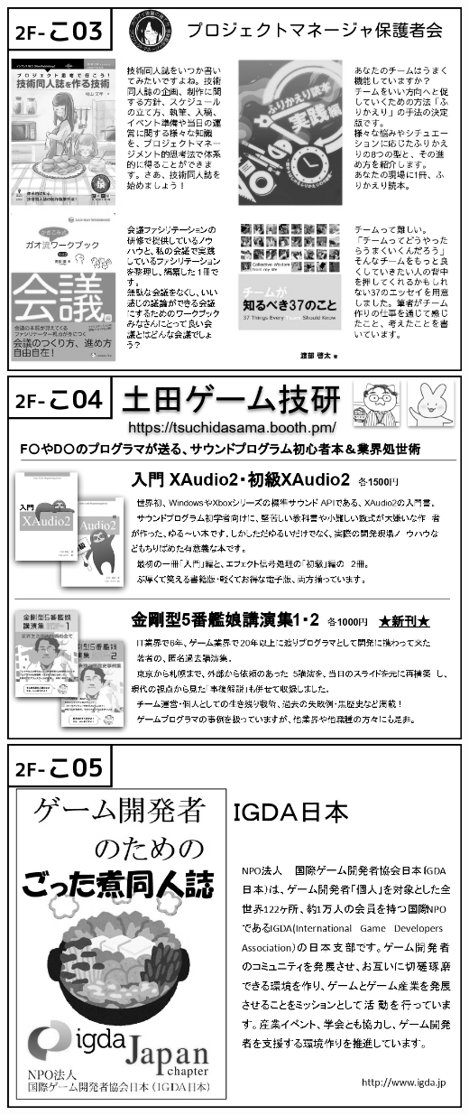 \begin{center}
\includegraphics[width=0.9\linewidth]{images/circle-appeals/2F-こ03.jpg}
\includegraphics[width=0.9\linewidth]{images/circle-appeals/2F-こ04.jpg}
\includegraphics[width=0.9\linewidth]{images/circle-appeals/2F-こ05.jpg}

\end{center}
